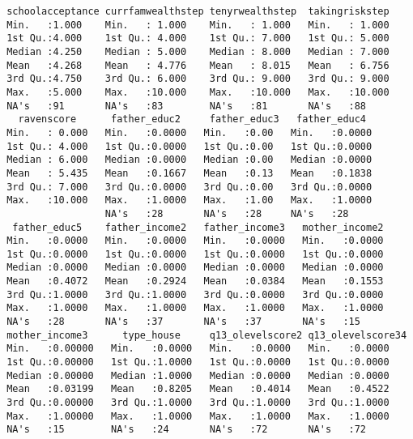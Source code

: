 \begin{verbatim}
 schoolacceptance currfamwealthstep tenyrwealthstep  takingriskstep  
 Min.   :1.000    Min.   : 1.000    Min.   : 1.000   Min.   : 1.000  
 1st Qu.:4.000    1st Qu.: 4.000    1st Qu.: 7.000   1st Qu.: 5.000  
 Median :4.250    Median : 5.000    Median : 8.000   Median : 7.000  
 Mean   :4.268    Mean   : 4.776    Mean   : 8.015   Mean   : 6.756  
 3rd Qu.:4.750    3rd Qu.: 6.000    3rd Qu.: 9.000   3rd Qu.: 9.000  
 Max.   :5.000    Max.   :10.000    Max.   :10.000   Max.   :10.000  
 NA's   :91       NA's   :83        NA's   :81       NA's   :88      
   ravenscore      father_educ2     father_educ3   father_educ4   
 Min.   : 0.000   Min.   :0.0000   Min.   :0.00   Min.   :0.0000  
 1st Qu.: 4.000   1st Qu.:0.0000   1st Qu.:0.00   1st Qu.:0.0000  
 Median : 6.000   Median :0.0000   Median :0.00   Median :0.0000  
 Mean   : 5.435   Mean   :0.1667   Mean   :0.13   Mean   :0.1838  
 3rd Qu.: 7.000   3rd Qu.:0.0000   3rd Qu.:0.00   3rd Qu.:0.0000  
 Max.   :10.000   Max.   :1.0000   Max.   :1.00   Max.   :1.0000  
                  NA's   :28       NA's   :28     NA's   :28      
  father_educ5    father_income2   father_income3   mother_income2  
 Min.   :0.0000   Min.   :0.0000   Min.   :0.0000   Min.   :0.0000  
 1st Qu.:0.0000   1st Qu.:0.0000   1st Qu.:0.0000   1st Qu.:0.0000  
 Median :0.0000   Median :0.0000   Median :0.0000   Median :0.0000  
 Mean   :0.4072   Mean   :0.2924   Mean   :0.0384   Mean   :0.1553  
 3rd Qu.:1.0000   3rd Qu.:1.0000   3rd Qu.:0.0000   3rd Qu.:0.0000  
 Max.   :1.0000   Max.   :1.0000   Max.   :1.0000   Max.   :1.0000  
 NA's   :28       NA's   :37       NA's   :37       NA's   :15      
 mother_income3      type_house     q13_olevelscore2 q13_olevelscore34
 Min.   :0.00000   Min.   :0.0000   Min.   :0.0000   Min.   :0.0000   
 1st Qu.:0.00000   1st Qu.:1.0000   1st Qu.:0.0000   1st Qu.:0.0000   
 Median :0.00000   Median :1.0000   Median :0.0000   Median :0.0000   
 Mean   :0.03199   Mean   :0.8205   Mean   :0.4014   Mean   :0.4522   
 3rd Qu.:0.00000   3rd Qu.:1.0000   3rd Qu.:1.0000   3rd Qu.:1.0000   
 Max.   :1.00000   Max.   :1.0000   Max.   :1.0000   Max.   :1.0000   
 NA's   :15        NA's   :24       NA's   :72       NA's   :72       
    \end{verbatim}

 